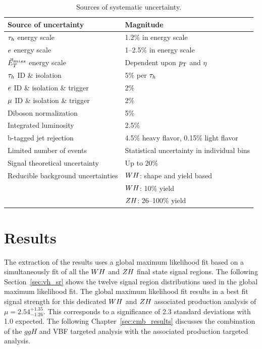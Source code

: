 \begin{table}[!ht]
\centering
{}
\begin{tabular}{ll}
Source of uncertainty & Magnitude \\
\hline
 $\tau_{h}$ energy scale                & 1.2\% in energy scale\\
 $e$ energy scale               & 1--2.5\%  in energy scale \\
 $\vec{E}^{miss}_T$ energy scale              & Dependent upon $p_\mathrm{T}$ and $\eta$ \\
 $\tau_{h}$ ID \& isolation & 5\% per $\tau_{h}$  \\
 $e$ ID \& isolation \& trigger  &   2\%  \\
 $\mu$ ID \& isolation \& trigger & 2\%  \\
 Diboson normalization & 5\% \\
 Integrated luminosity     & 2.5\%  \\
 b-tagged jet rejection & 4.5\% heavy flavor, 0.15\% light flavor \\
 Limited number of events                & Statistical uncertainty in individual bins  \\
 Signal theoretical uncertainty  & Up to 20\% \\
 Reducible background uncertainties & $WH$: shape and yield based \\
                                    & $WH$: 10\% yield \\
                                    & $ZH$: 26--100\% yield \\
\hline
\end{tabular}
\caption{Sources of systematic uncertainty.}
\label{tab:vh_uncertainties}
\end{table}



\section{Results}
\label{sec:vh_results}

The extraction of the results uses a global maximum likelihood fit based on a 
simultaneously fit of all the $WH$ and $ZH$ final state signal regions. 
The following Section~\ref{sec:vh_sr} shows the twelve signal region distributions
used in the global maximum likelihood fit. 
The global maximum likelihood fit results in a best fit signal
strength for this dedicated $WH$ and $ZH$ associated production analysis of
$\mu = 2.54 ^{+1.35} _{-1.26}$. This corresponds to 
a significance of 2.3 standard deviations with 1.0 expected.
The following Chapter~\ref{sec:cmb_results} discusses the combination of the
$ggH$ and VBF targeted analysis with the associated production targeted
analysis.

